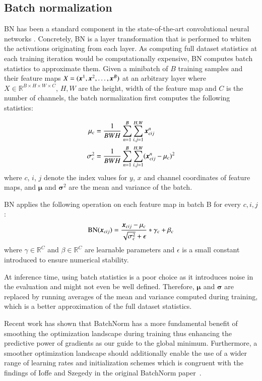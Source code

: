 \documentclass{article}
\begin{document}
\subsection{Batch normalization}





BN has been a standard component in the state-of-the-art 
convolutional neural networks \cite{he2016deep,huang2017densely}.
Concretely, BN is a
layer transformation that is performed to whiten the activations
originating from each layer. 
As computing full dataset statistics at each training iteration
would be computationally expensive, BN computes batch statistics
to approximate them. 
Given a minibatch of $B$ training samples and their feature maps
 $X = (\bm{x}^1, \bm{x}^2,\ldots , \bm{x}^B)$ at an arbitrary layer where $X \in \mathbb{R}^{B\times H \times W \times C}$, $H, W$ are the height, width of the feature map and $C$ is the number of channels, the batch normalization first computes the following statistics:

\begin{align}
\label{eq.bnstats}
    \mu_c &= \frac{1}{BWH}  \sum_{n=1}^{B}\sum_{i,j=1}^{H,W} \bm{x}_{cij}^{n}\\
    \sigma^2_c &= \frac{1}{BWH}
    \sum_{n=1}^{B}\sum_{i,j=1}^{H,W} (\bm{x}_{cij}^{n} - \mu_{c})^2
\end{align} where $c$, $i$, $j$ denote the index values for $y$, $x$ and channel coordinates of feature maps, and $\bm{\mu}$ and $\bm{\sigma}^2$ are the mean and variance of the batch.

BN applies the following operation on each feature map in batch B for every $c,i,j$:
\begin{equation}
\label{eq.bnop}
\text{BN}(\bm{x}_{cij}) = \frac{\bm{x}_{cij} - \mu_{c}}{\sqrt{\sigma^2_{c}} + \epsilon} * \gamma_{c} + \beta_{c}
\end{equation} where $\gamma \in \mathbb{R}^C$ and $\beta\in \mathbb{R}^C$ are learnable parameters and $\epsilon$ is a small constant introduced to ensure numerical stability.

At inference time, using batch statistics is a poor choice as it introduces noise in the evaluation and might not even be well defined. Therefore, $\bm{\mu}$ and $\bm{\sigma}$ are replaced by running averages of the mean and variance computed during training, which is a better approximation of the full dataset statistics.

Recent work
has shown that BatchNorm has a more fundamental
benefit of smoothing the optimization landscape during
training \cite{santurkar2018does} thus enhancing the predictive
power of gradients as our guide to the global minimum.
Furthermore, a smoother optimization landscape should
additionally enable the use of a wider range of learning
rates and initialization schemes which is congruent with the
findings of Ioffe and Szegedy in the original BatchNorm
paper~\cite{ioffe2015batch}.
\end{document}
